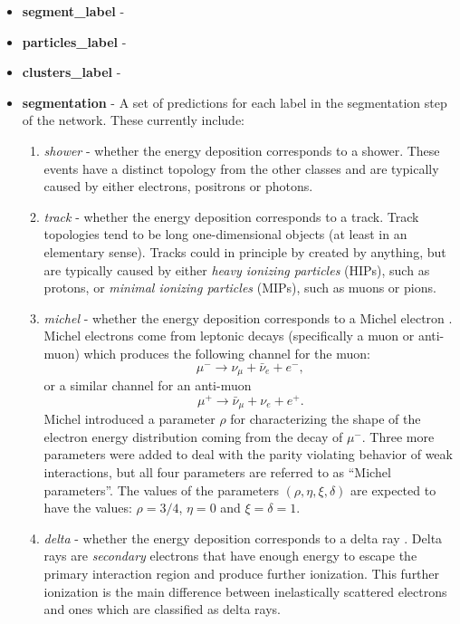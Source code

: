 \documentclass[8pt]{refart}
\begin{document}
\begin{itemize}
    \item \textbf{segment\_label} - 
    \item \textbf{particles\_label} - 
    \item \textbf{clusters\_label} - 
    \item \textbf{segmentation} - A set of predictions for each label in the segmentation step of the network.  These currently include:
    \begin{enumerate}
        \item \textit{shower} - whether the energy deposition corresponds to a shower.  These events have a distinct topology from the other classes and are typically caused by either electrons, positrons or photons.
        \item \textit{track} - whether the energy deposition corresponds to a track.  Track topologies tend to be long one-dimensional objects (at least in an elementary sense).  Tracks could in principle by created by anything, but are typically caused by either \textit{heavy ionizing particles} (HIPs), such as protons, or \textit{minimal ionizing particles} (MIPs), such as muons or pions.
        \item \textit{michel} - whether the energy deposition corresponds to a Michel electron \cite{Michel}.  Michel electrons come from leptonic decays (specifically a muon or anti-muon) which produces the following channel for the muon:
        \begin{equation}
            \mu^{-} \rightarrow \nu_{\mu} + \bar{\nu}_e + e^-,
        \end{equation}
        or a similar channel for an anti-muon
        \begin{equation}
            \mu^+ \rightarrow \bar{\nu}_{\mu} + \nu_e + e^+.
        \end{equation}
        Michel introduced a parameter $\rho$ for characterizing the shape of the electron energy distribution coming from the decay of $\mu^-$.  Three more parameters were added to deal with the parity violating behavior of weak interactions, but all four parameters are referred to as ``Michel parameters''.  The values of the parameters $(\rho,\eta,\xi,\delta)$ are expected to have the values: $\rho=3/4$, $\eta=0$ and $\xi=\delta=1$.
        \item \textit{delta} - whether the energy deposition corresponds to a delta ray \cite{Delta}.  Delta rays are \textit{secondary} electrons that have enough energy to escape the primary interaction region and produce further ionization.  This further ionization is the main difference between inelastically scattered electrons and ones which are classified as delta rays.

\end{enumerate}
\end{itemize}
\end{document}
